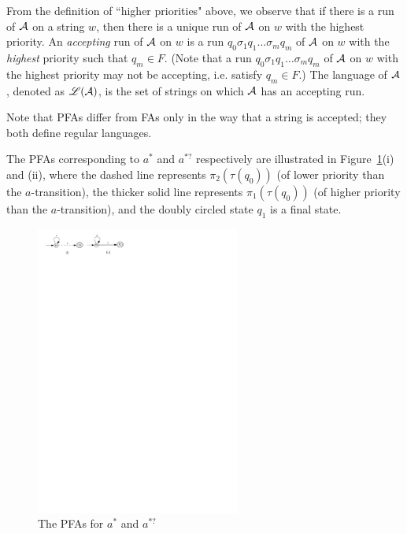 From the definition of ``higher priorities" above, we observe that if there is a  run of $\mathcal{A}$ on a string $w$, then there is a unique run of $\mathcal{A}$ on $w$ with the highest priority. 
An \emph{accepting} run of $\mathcal{A}$ on $w$ is a run $q_0 \sigma_1 q_1 \ldots \sigma_m q_m$ of $\mathcal{A}$ on $w$ with the \emph{highest} priority such that $q_m \in F$. (Note that a run $q_0 \sigma_1 q_1 \ldots \sigma_m q_m$ of $\mathcal{A}$ on $w$ with the highest priority may not be accepting, i.e. satisfy $q_m \in F$.) The language of $\mathcal{A}$, denoted as $\mathscr{L}(\mathcal{A})$, is the set of strings on which $\mathcal{A}$ has an accepting run.


Note that PFAs differ from FAs only in the way that a string is accepted; they both define regular languages. 


\begin{example}\label{exmp-pfa}
The PFAs corresponding to $a^\ast$ and $a^{\ast?}$ respectively are illustrated in Figure~\ref{fig-pfa}(i) and (ii), where the dashed line represents $\pi_2(\tau(q_0))$ (of lower priority than the $a$-transition), the thicker solid line represents $\pi_1(\tau(q_0))$ (of higher priority than the $a$-transition), and the doubly circled state $q_1$ is a final state.

\begin{figure}[ht]
\centering
\includegraphics[width=0.6\textwidth]{pfa.pdf}
\caption{The PFAs for $a^\ast$ and $a^{\ast?}$}
\label{fig-pfa}
\end{figure}
\end{example}

